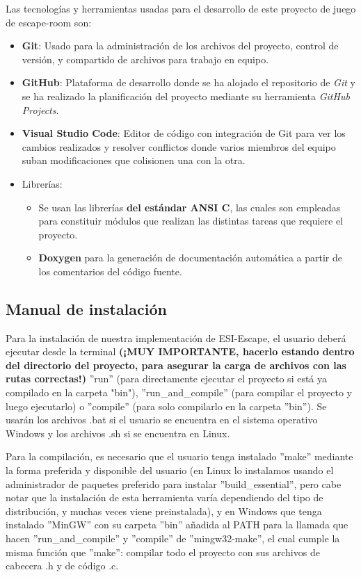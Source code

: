 Las tecnologías y herramientas usadas para el desarrollo de este proyecto de juego de escape-room son:
\begin{itemize}

	\item \textbf{Git}: Usado para la administración de los archivos del proyecto, control de versión, y compartido de archivos para trabajo en equipo.
	\item \textbf{GitHub}: Plataforma de desarrollo donde se ha alojado el repositorio de \emph{Git} y se ha realizado la planificación del proyecto mediante su herramienta \emph{GitHub Projects}.
	\item \textbf{Visual Studio Code}: Editor de código con integración de Git para ver los cambios realizados y resolver conflictos donde varios miembros del equipo suban modificaciones que colisionen una con la otra.
	\item Librerías: 
	\begin{itemize}
		\item Se usan las librerías \textbf{del estándar ANSI C}, las cuales son empleadas para constituir módulos que realizan las distintas tareas que requiere el proyecto.
		\item \textbf{Doxygen} para la generación de documentación automática a partir de los comentarios del código fuente.
	\end{itemize}
\end{itemize}


\subsection{Manual de instalación}

Para la instalación de nuestra implementación de ESI-Escape, el usuario deberá ejecutar desde la terminal \textbf{(¡MUY IMPORTANTE, hacerlo estando dentro del directorio del proyecto, para asegurar la carga de archivos con las rutas correctas!)} ''run'' (para directamente ejecutar el proyecto si está ya compilado en la carpeta "bin"), ''run\_and\_compile'' (para compilar el proyecto y luego ejecutarlo) o ''compile'' (para solo compilarlo en la carpeta ''bin''). Se usarán los archivos .bat si el usuario se encuentra en el sistema operativo Windows y los archivos .sh si se encuentra en Linux.

\bigskip

Para la compilación, es necesario que el usuario tenga instalado ''make'' mediante la forma preferida y disponible del usuario (en Linux lo instalamos usando el administrador de paquetes preferido para instalar ''build\_essential'', pero cabe notar que la instalación de esta herramienta varía dependiendo del tipo de distribución, y muchas veces viene preinstalada), y en Windows que tenga instalado ''MinGW'' con su carpeta ''bin'' añadida al PATH para la llamada que hacen ''run\_and\_compile'' y ''compile'' de ''mingw32-make'', el cual cumple la misma función que ''make'': compilar todo el proyecto con sus archivos de cabecera .h y de código .c.

